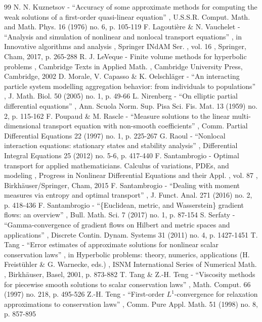 \documentclass[11pt]{article}
\numberwithin{equation}{section}
\theoremstyle{plain}
\theoremstyle{definition}
\begin{document}
\begin{thebibliography}{99}
 N. N. Kuznetsov - “Accuracy of some approximate methods for computing the weak solutions of a first-order quasi-linear equation” , U.S.S.R. Comput. Math. and Math. Phys. 16 (1976) no. 6, p. 105-119
 F. Lagoutière \& N. Vauchelet - “Analysis and simulation of nonlinear and nonlocal transport equations” , in Innovative algorithms and analysis , Springer INdAM Ser. , vol. 16 , Springer, Cham, 2017, p. 265-288
 R. J. LeVeque - Finite volume methods for hyperbolic problems , Cambridge Texts in Applied Math. , Cambridge University Press, Cambridge, 2002
 D. Morale, V. Capasso \& K. Oelschläger - “An interacting particle system modelling aggregation behavior: from individuals to populations” , J. Math. Biol. 50 (2005) no. 1, p. 49-66
 L. Nirenberg - “On elliptic partial differential equations” , Ann. Scuola Norm. Sup. Pisa Sci. Fis. Mat. 13 (1959) no. 2, p. 115-162
 F. Poupaud \& M. Rascle - “Measure solutions to the linear multi-dimensional transport equation with non-smooth coefficients” , Comm. Partial Differential Equations 22 (1997) no. 1, p. 225-267
 G. Raoul - “Nonlocal interaction equations: stationary states and stability analysis” , Differential Integral Equations 25 (2012) no. 5-6, p. 417-440
 F. Santambrogio - Optimal transport for applied mathematicians. Calculus of variations, PDEs, and modeling , Progress in Nonlinear Differential Equations and their Appl. , vol. 87 , Birkhäuser/Springer, Cham, 2015
 F. Santambrogio - “Dealing with moment measures via entropy and optimal transport” , J. Funct. Anal. 271 (2016) no. 2, p. 418-436
 F. Santambrogio - “\{Euclidean, metric, and Wasserstein\} gradient flows: an overview” , Bull. Math. Sci. 7 (2017) no. 1, p. 87-154
 S. Serfaty - “Gamma-convergence of gradient flows on Hilbert and metric spaces and applications” , Discrete Contin. Dynam. Systems 31 (2011) no. 4, p. 1427-1451
 T. Tang - “Error estimates of approximate solutions for nonlinear scalar conservation laws” , in Hyperbolic problems: theory, numerics, applications (H. Freistühler \& G. Warnecke, eds.) , ISNM International Series of Numerical Math. , Birkhäuser, Basel, 2001, p. 873-882
 T. Tang \& Z.-H. Teng - “Viscosity methods for piecewise smooth solutions to scalar conservation laws” , Math. Comput. 66 (1997) no. 218, p. 495-526
 Z.-H. Teng - “First-order $L^1$-convergence for relaxation approximations to conservation laws” , Comm. Pure Appl. Math. 51 (1998) no. 8, p. 857-895

\end{thebibliography}
\end{document}
